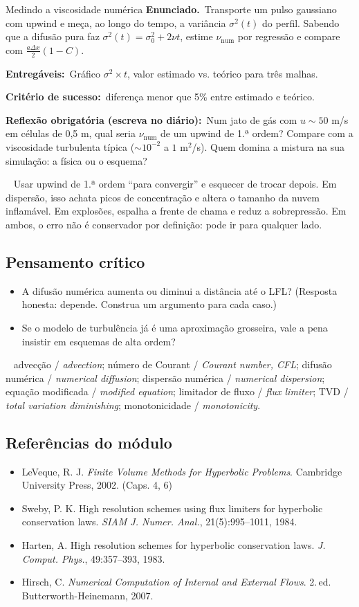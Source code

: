 \documentclass[10pt,a4paper,twocolumn,openany]{report}
\newcommand{\lead}[2]{\par\medskip\noindent{\color{#1}\bfseries #2}\ }
\newenvironment{armadilha}{\lead{vermelho}{Armadilha clássica.}}{\par\medskip}
\newenvironment{critico}{\subsection*{\textcolor{roxo}{Pensamento crítico}}}{\par}
\newenvironment{chaves}{\lead{cinza}{Palavras-chave (PT/EN):}\small}{\par}
\newenvironment{refs}{\subsection*{Referências do módulo}\small}{\par}
\newcommand{\enunciado}{\noindent\textbf{Enunciado.}\ }
\newcommand{\entregaveis}{\par\medskip\noindent\textbf{Entregáveis:}}
\newcommand{\criterio}{\par\medskip\noindent\textbf{Critério de sucesso:}\ }
\newcommand{\reflexao}{\par\medskip\noindent\textbf{Reflexão obrigatória (escreva no diário):}}
\begin{document}
\begin{tarefa}{Medindo a viscosidade numérica}
\enunciado Transporte um pulso gaussiano com upwind e meça, ao longo do tempo,
a variância $\sigma^2(t)$ do perfil. Sabendo que a difusão pura faz
$\sigma^2(t)=\sigma_0^2+2\nu t$, estime $\nu_{\text{num}}$ por regressão e
compare com $\frac{a\Delta x}{2}(1-C)$.
\entregaveis\ Gráfico $\sigma^2\times t$, valor estimado vs. teórico para
três malhas.
\criterio diferença menor que 5\% entre estimado e teórico.
\reflexao\ Num jato de gás com $u\sim 50$ m/s em células de 0,5 m, qual seria
$\nu_{\text{num}}$ de um upwind de 1.ª ordem? Compare com a viscosidade
turbulenta típica ($\sim 10^{-2}$ a $1$ m$^2$/s). Quem domina a mistura na
sua simulação: a física ou o esquema?
\end{tarefa}

\begin{armadilha}
Usar upwind de 1.ª ordem ``para convergir'' e esquecer de trocar depois. Em
dispersão, isso achata picos de concentração e altera o tamanho da nuvem
inflamável. Em explosões, espalha a frente de chama e reduz a sobrepressão.
Em ambos, o erro não é conservador por definição: pode ir para qualquer lado.
\end{armadilha}

\begin{critico}
\begin{itemize}
  \item A difusão numérica aumenta ou diminui a distância até o LFL? (Resposta
        honesta: depende. Construa um argumento para cada caso.)
  \item Se o modelo de turbulência já é uma aproximação grosseira, vale a
        pena insistir em esquemas de alta ordem?
\end{itemize}
\end{critico}

\begin{chaves}
advecção / \emph{advection}; número de Courant / \emph{Courant number, CFL};
difusão numérica / \emph{numerical diffusion}; dispersão numérica /
\emph{numerical dispersion}; equação modificada / \emph{modified equation};
limitador de fluxo / \emph{flux limiter}; TVD / \emph{total variation
diminishing}; monotonicidade / \emph{monotonicity}.
\end{chaves}

\begin{refs}
\begin{itemize}
  \item LeVeque, R. J. \emph{Finite Volume Methods for Hyperbolic Problems}. Cambridge University Press, 2002. (Caps. 4, 6)
  \item Sweby, P. K. High resolution schemes using flux limiters for hyperbolic conservation laws. \emph{SIAM J. Numer. Anal.}, 21(5):995--1011, 1984.
  \item Harten, A. High resolution schemes for hyperbolic conservation laws. \emph{J. Comput. Phys.}, 49:357--393, 1983.
  \item Hirsch, C. \emph{Numerical Computation of Internal and External Flows}. 2.\,ed. Butterworth-Heinemann, 2007.
\end{itemize}
\end{refs}
\end{document}
